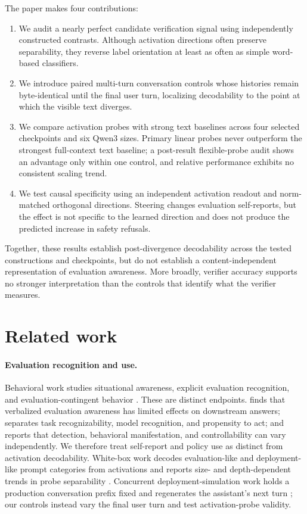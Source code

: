 \documentclass{article}
\begin{document}
The paper makes four contributions:
\begin{enumerate}
  \item We audit a nearly perfect candidate verification signal using independently
  constructed contrasts. Although activation directions often preserve
  separability, they reverse label orientation at least as often as simple
  word-based classifiers.
  \item We introduce paired multi-turn conversation controls whose histories
  remain byte-identical until the final user turn, localizing decodability to
  the point at which the visible text diverges.
  \item We compare activation probes with strong text baselines across four
  selected checkpoints and six Qwen3 sizes. Primary linear probes never
  outperform the strongest full-context text baseline; a post-result
  flexible-probe audit shows an advantage only within one control, and relative
  performance exhibits no consistent scaling trend.
  \item We test causal specificity using an independent activation readout and
  norm-matched orthogonal directions. Steering changes evaluation self-reports,
  but the effect is not specific to the learned direction and does not produce
  the predicted increase in safety refusals.
\end{enumerate}
Together, these results establish
post-divergence decodability across the tested constructions and checkpoints,
but do not establish a content-independent representation of evaluation
awareness. More broadly, verifier accuracy supports no stronger interpretation
than the controls that identify what the verifier measures.

\section{Related work}

\paragraph{Evaluation recognition and use.}
Behavioral work studies situational awareness, explicit evaluation recognition,
and evaluation-contingent behavior
\citep{laine2024sad,needham2025know,greenblatt2024alignment}. These are distinct
endpoints. \citet{knecht2026limited} finds that verbalized evaluation awareness
has limited effects on downstream answers; \citet{li2026decomposing} separates
task recognizability, model recognition, and propensity to act; and
\citet{nayan2026notone} reports that detection, behavioral manifestation, and
controllability can vary independently. We therefore treat self-report and
policy use as distinct from activation decodability. White-box work decodes
evaluation-like and deployment-like prompt categories from activations \citep{nguyen2025probing}
and reports size- and depth-dependent trends in probe separability
\citep{chaudhary2025scaling,manek2026depth}. Concurrent deployment-simulation
work holds a production conversation prefix fixed and regenerates the
assistant's next turn \citep{williams2026simulating}; our controls instead vary
the final user turn and test activation-probe validity.
\end{document}
